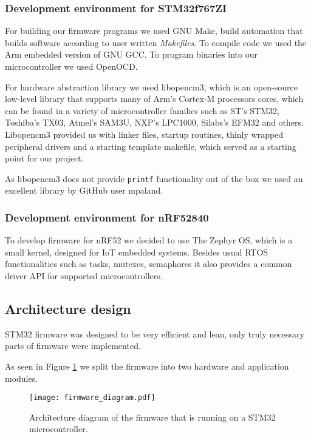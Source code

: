\subsubsection{ Development environment for STM32f767ZI}

For building our firmware programs we used GNU Make, build automation that builds software according to user written \textit{Makefiles}.
To compile code we used the Arm embedded version of GNU GCC.
To program binaries into our microcontroller we used OpenOCD.

For hardware abstraction library we used libopencm3, which is an open-source low-level library that supports many of Arm's Cortex-M processors cores, which can be found in a variety of microcontroller families such as ST's STM32, Toshiba's TX03, Atmel's SAM3U, NXP's LPC1000, Silabs's EFM32 and others.
Libopencm3 provided us with linker files, startup routines, thinly wrapped peripheral drivers and a starting template makefile, which served as a starting point for our project.

As libopencm3 does not provide \verb|printf| functionality out of the box we used an excellent library by GitHub user mpaland\cite{printf_lib}.


\subsubsection{ Development environment for nRF52840}

To develop firmware for nRF52 we decided to use The Zephyr OS, which is a small kernel, designed for IoT embedded systems.
Besides usual RTOS functionalities such as tasks, mutexes, semaphores it also provides a common driver API for supported microcontrollers.


\subsection{ Architecture design}

STM32 firmware was designed to be very efficient and lean, only truly necessary parts of firmware were implemented.

As seen in Figure \ref{firmware_diagram} we split the firmware into two hardware and application modules.

\begin{figure}[ht]
        \centering
        \texttt{[image: firmware\_diagram.pdf]} 
        \caption{ Architecture diagram of the firmware that is running on a STM32 microcontroller.} 
        \label{firmware_diagram}
\end{figure}

